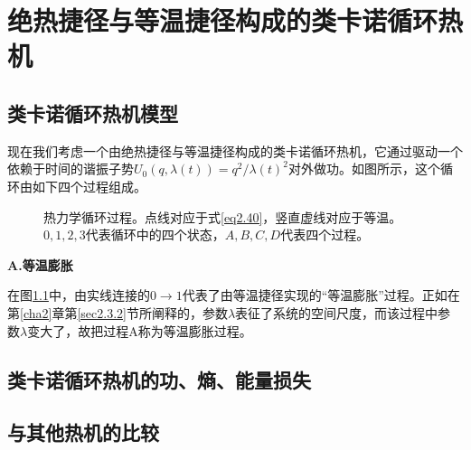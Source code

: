 \chapter{绝热捷径与等温捷径构成的类卡诺循环热机}

\section{类卡诺循环热机模型}

\qquad 现在我们考虑一个由绝热捷径与等温捷径构成的类卡诺循环热机，它通过驱动一个依赖于时间的谐振子势$U_{0}(q, \lambda(t))= q^{2}/{\lambda(t)}^2 $对外做功。如图所示，这个循环由如下四个过程组成。

\begin{figure}[!htbp]
    \centering
    \def\svgwidth{0.6\columnwidth}
    
    \caption{热力学循环过程。点线对应于式\eqref{eq2.40}，竖直虚线对应于等温。$0,1,2,3$代表循环中的四个状态，$A,B,C,D$代表四个过程。}
    \label{p3.1}
\end{figure}


\begin{center}
    {\bfseries A.等温膨胀}
\end{center}

在图\ref{p3.1}中，由实线连接的$0 \to 1$代表了由等温捷径实现的“等温膨胀”过程。正如在第\ref{cha2}章第\ref{sec2.3.2}节所阐释的，参数$\lambda$表征了系统的空间尺度，而该过程中参数$\lambda$变大了，故把过程A称为等温膨胀过程。

\section{类卡诺循环热机的功、熵、能量损失}

\section{与其他热机的比较}